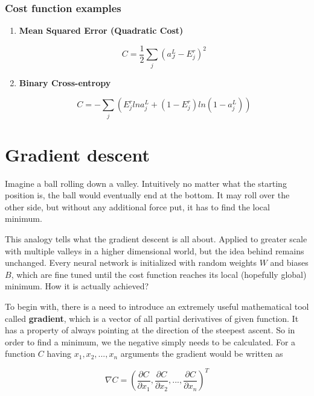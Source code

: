 \subsubsection*{Cost function examples}
\label{sub2:cost-function-examples}

\begin{enumerate}
    \item \textbf{Mean Squared Error (Quadratic Cost)}
    
    \begin{equation}
        C = \frac{1}{2}\sum_j (a^L_J - E^r_j)^2
    \end{equation}
    
    \item \textbf{Binary Cross-entropy}
    
    \begin{equation}
        C = -\sum_j\left(E_j^rlna_j^L + (1-E_j^r) ln(1 - a_j^L)\right)
    \end{equation}
    
\end{enumerate}

\section{Gradient descent}
\label{sec:gradient-descent}

Imagine a ball rolling down a valley. Intuitively no matter what the starting position is, the ball would eventually end at the bottom. It may roll over the other side, but without any additional force put, it has to find the local minimum. 

This analogy tells what the gradient descent is all about. Applied to greater scale with multiple valleys in a higher dimensional world, but the idea behind remains unchanged. Every neural network is initialized with random weights $W$ and biases $B$, which are fine tuned until the cost function reaches its local (hopefully global) minimum. How it is actually achieved?

To begin with, there is a need to introduce an extremely useful mathematical tool called \textbf{gradient}, which is a vector of all partial derivatives of given function. It has a property of always pointing at the direction of the steepest ascent. So in order to find a minimum, we the negative simply needs to be calculated. For a function $C$ having $x_1, x_2, ..., x_n$ arguments the gradient would be written as 

\begin{equation}
    \nabla C = \left(\frac{\partial C}{\partial x_1}, \frac{\partial C}{\partial x_2}, ..., \frac{\partial C}{\partial x_n}\right)^T
\end{equation}

